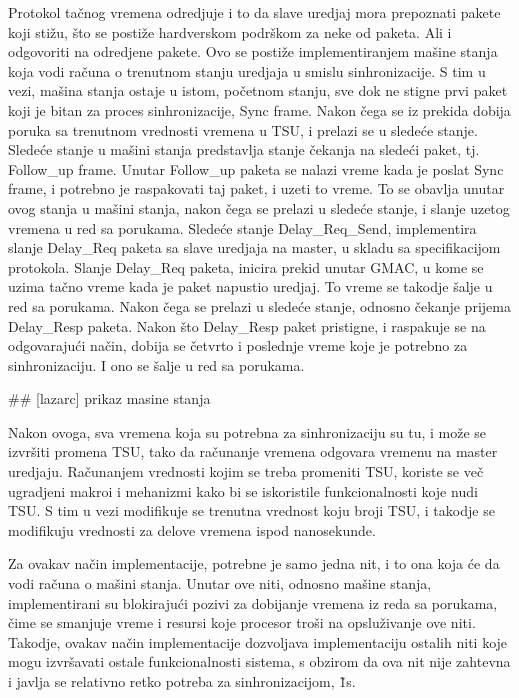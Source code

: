 \documentclass[a4paper,12pt, master]{etf}
\begin{document}
	Protokol ta\v{c}nog vremena odredjuje i to da slave uredjaj mora prepoznati 
	pakete koji sti\v{z}u, \v{s}to se posti\v{z}e hardverskom podr\v{s}kom za 
	neke od paketa. Ali i odgovoriti na odredjene pakete. Ovo se posti\v{z}e 
	implementiranjem ma\v{s}ine stanja koja vodi ra\v{c}una o trenutnom stanju 
	uredjaja u smislu sinhronizacije. S tim u vezi, ma\v{s}ina stanja ostaje u 
	istom, po\v{c}etnom stanju, sve dok ne stigne prvi paket koji je bitan za
	proces sinhronizacije, Sync frame. Nakon \v{c}ega se iz prekida dobija 
	poruka sa trenutnom vrednosti vremena u TSU, i prelazi se u slede\'{c}e 
	stanje. Slede\'{c}e stanje u ma\v{s}ini stanja predstavlja stanje 
	\v{c}ekanja na slede\'{c}i paket, tj. Follow\_up frame. Unutar Follow\_up 
	paketa se nalazi vreme kada je poslat Sync frame, i potrebno je raspakovati 
	taj paket, i uzeti to vreme. To se obavlja unutar ovog stanja u ma\v{s}ini 
	stanja, nakon \v{c}ega se prelazi u slede\'{c}e stanje, i slanje uzetog 
	vremena u red sa porukama. Slede\'{c}e stanje Delay\_Req\_Send, 
	implementira slanje Delay\_Req paketa sa slave uredjaja na master, u skladu 
	sa specifikacijom protokola. Slanje Delay\_Req paketa, inicira prekid 
	unutar GMAC, u kome se uzima ta\v{c}no vreme kada je paket napustio 
	uredjaj. To vreme se takodje \v{s}alje u red sa porukama. Nakon \v{c}ega se 
	prelazi u slede\'{c}e stanje, odnosno \v{c}ekanje prijema Delay\_Resp 
	paketa. Nakon \v{s}to Delay\_Resp paket pristigne, i raspakuje se na 
	odgovaraju\'{c}i na\v{c}in, dobija se \v{c}etvrto i poslednje vreme koje je 
	potrebno za sinhronizaciju. I ono se \v{s}alje u red sa porukama.

	\#\# [lazarc] prikaz masine stanja

	Nakon ovoga, sva vremena koja su potrebna za sinhronizaciju su tu, i 
	mo\v{z}e se izvr\v{s}iti promena TSU, tako da ra\v{c}unanje vremena 
	odgovara vremenu na master uredjaju. Ra\v{c}unanjem vrednosti kojim se 
	treba promeniti TSU, koriste se ve\v{c} ugradjeni makroi i mehanizmi kako 
	bi se iskoristile funkcionalnosti koje nudi TSU\@. S tim u vezi modifikuje 
	se trenutna vrednost koju broji TSU, i takodje se modifikuju vrednosti za 
	delove vremena ispod nanosekunde.

	Za ovakav na\v{c}in implementacije, potrebne je samo jedna nit, i to ona 
	koja \'{c}e da vodi ra\v{c}una o ma\v{s}ini stanja. Unutar ove niti, 
	odnosno ma\v{s}ine stanja, implementirani su blokiraju\'{c}i pozivi za 
	dobijanje vremena iz reda sa porukama, \v{c}ime se smanjuje vreme i resursi 
	koje procesor tro\v{s}i na opslu\v{z}ivanje ove niti. Takodje, ovakav 
	na\v{c}in implementacije dozvoljava implementaciju ostalih niti koje mogu 
	izvr\v{s}avati ostale funkcionalnosti sistema, s obzirom da ova nit nije 
	zahtevna i javlja se relativno retko potreba za sinhronizacijom, \~1s.
\end{document}
